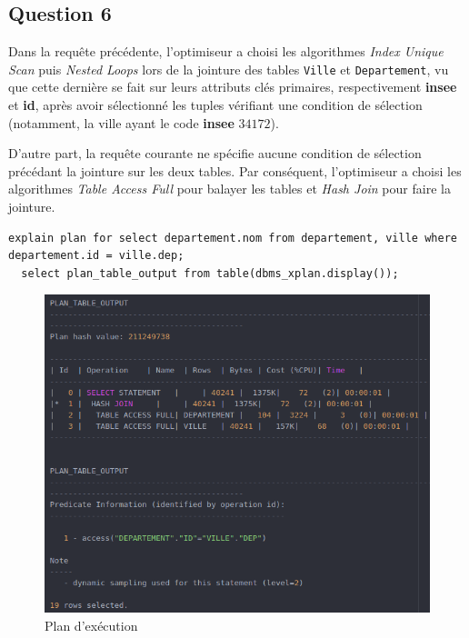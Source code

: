 \documentclass[a4paper,12pt]{article}
\begin{document}
\newpage

\subsection{Question 6}
Dans la requête précédente, l'optimiseur a choisi les algorithmes \textit{Index Unique Scan} puis \textit{Nested Loops} lors de la jointure des tables \texttt{Ville} et \texttt{Departement}, vu que cette dernière se fait sur leurs attributs clés primaires, respectivement \textbf{insee} et \textbf{id}, après avoir sélectionné les tuples vérifiant une condition de sélection (notamment, la ville ayant le code \textbf{insee} $34172$).

D'autre part, la requête courante ne spécifie aucune condition de sélection précédant la jointure sur les deux tables. Par conséquent, l'optimiseur a choisi les algorithmes \textit{Table Access Full} pour balayer les tables et \textit{Hash Join} pour faire la jointure.

\begin{lstlisting}[caption={requêtes permettant d'expliquer le plan d'exécution affichant le nom du département pour toutes les villes}, label={lst:question_6}]
  explain plan for select departement.nom from departement, ville where departement.id = ville.dep;
  select plan_table_output from table(dbms_xplan.display());
\end{lstlisting}

\begin{figure}[!ht]
  \centering
  \includegraphics[scale=0.6]{images/q6_1.png}
  \caption{Plan d'exécution}
\end{figure}
\end{document}

